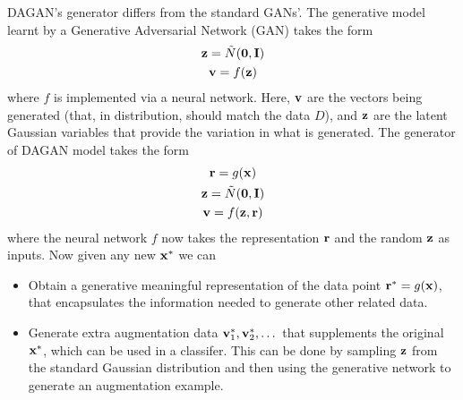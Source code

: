 \documentclass{article}
\begin{document}
DAGAN's generator differs from the standard GANs'. The generative model learnt by a Generative Adversarial Network (GAN) takes the form
\begin{gather*}
{\bf z}=\tilde{N}({\bf 0},{\bf I})\\
{\bf v}=f({\bf z})
\end{gather*}
where $f$ is implemented via a neural network. Here, ${\bf v}$ are the vectors being generated (that, in distribution, should match the data $D$), and ${\bf z}$ are the latent Gaussian variables that provide the
variation in what is generated. The generator of DAGAN model takes the form
\begin{gather*}
{\bf r}=g({\bf x})\\
{\bf z}=\tilde{N}({\bf 0},{\bf I})\\
{\bf v}=f({\bf z},{\bf r})
\end{gather*}
where the neural network $f$ now takes the representation ${\bf r}$ and the random ${\bf z}$ as inputs. Now given any new ${\bf x}^*$ we can
\begin{itemize}
\item Obtain a generative meaningful representation of the data point ${\bf r}^*=g({\bf x})$, that encapsulates the information needed to generate other related data.
\item Generate extra augmentation data ${\bf v}_1^*,{\bf v}_2^*,\dots$ that supplements the original ${\bf x}^*$, which can be used in a classifer. This can be done by sampling ${\bf z}$ from the standard Gaussian distribution and then using the generative network to generate an augmentation example.
\end{itemize}
\end{document}
